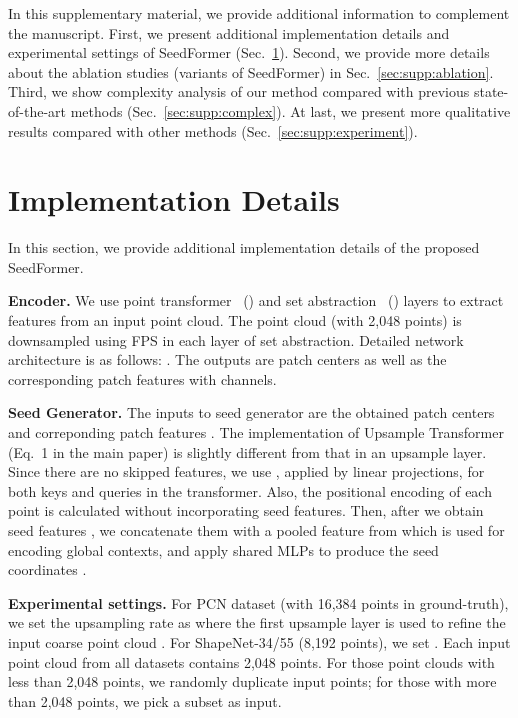 \newpage
\renewcommand\thesection{\Alph{section}}
\renewcommand\thesubsection{\Alph{subsection}}

\setcounter{section}{0}


In this supplementary material, we provide additional information to complement the manuscript. First, we present additional implementation details and experimental settings of SeedFormer (Sec.~\ref{sec:supp:detail}). Second, we provide more details about the ablation studies (variants of SeedFormer) in Sec.~\ref{sec:supp:ablation}. Third, we show complexity analysis of our method compared with previous state-of-the-art methods (Sec.~\ref{sec:supp:complex}). At last, we present more qualitative results compared with other methods (Sec.~\ref{sec:supp:experiment}).

\section{Implementation Details}
\label{sec:supp:detail}
In this section, we provide additional implementation details of the proposed SeedFormer.

\vspace{5pt}
\noindent\textbf{Encoder.} We use point transformer~\cite{zhao2021point} () and set abstraction~\cite{qi2017pointnet++} () layers to extract features from an input point cloud. The point cloud (with 2,048 points) is downsampled using FPS in each layer of set abstraction. Detailed network architecture is as follows: . The outputs are  patch centers  as well as the corresponding patch features  with  channels. 

\vspace{5pt}
\noindent\textbf{Seed Generator.} The inputs to seed generator are the obtained patch centers  and correponding patch features . 
The implementation of Upsample Transformer (Eq.~1 in the main paper) is slightly different from that in an upsample layer.
Since there are no skipped features, we use , applied by linear projections, for both keys and queries in the transformer. Also, the positional encoding of each point is calculated without incorporating seed features. Then, after we obtain seed features , we concatenate them with a pooled feature from  which is used for encoding global contexts, and apply shared MLPs to produce the seed coordinates .

\vspace{5pt}
\noindent\textbf{Experimental settings.} For PCN dataset (with 16,384 points in ground-truth), we set the upsampling rate as  where the first upsample layer is used to refine the input coarse point cloud . For ShapeNet-34/55 (8,192 points), we set . Each input point cloud from all datasets contains 2,048 points. For those point clouds with less than 2,048 points, we randomly duplicate input points; for those with more than 2,048 points, we pick a subset as input. 

